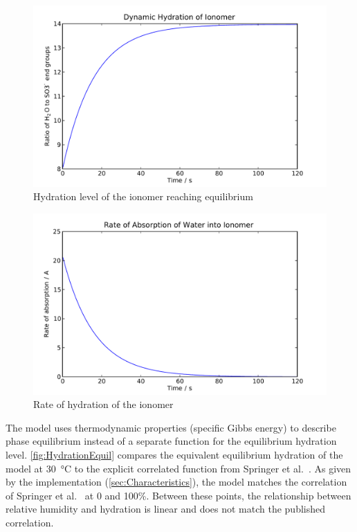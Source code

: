 \begin{figure}[htbp]
  \includegraphics[width=\linewidth]{Results/Basic/Hydration/1/Level}%
  \caption{Hydration level of the ionomer reaching equilibrium}%
  \label{fig:HydrationLevel}
\end{figure}

\begin{figure}[htbp]
  \includegraphics[width=\linewidth]{Results/Basic/Hydration/1/Rate}%
  \caption{Rate of hydration of the ionomer}%
  \label{fig:HydrationRate}
\end{figure}

The model uses thermodynamic properties (specific Gibbs energy) to describe phase equilibrium instead of a separate function for the equilibrium hydration level.  \autoref{fig:HydrationEquil} compares the equivalent equilibrium hydration of the model at \SI{30}{\celsius} to the explicit correlated function from Springer et al.~\cite{Springer1991}.   As given by the implementation (\autoref{sec:Characteristics}), the model matches the correlation of Springer et al.~\cite{Springer1991} at 0 and 100\%.  Between these points, the relationship between relative humidity and hydration is linear and does not match the published correlation.

